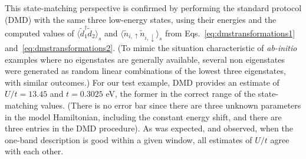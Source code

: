 This state-matching perspective is confirmed by performing the standard protocol (DMD) with the same three low-energy states, 
using their energies and the computed values of $\langle \tilde{d}_1^{\dagger} \tilde{d}_2 \rangle_s$ 
and $\langle \tilde{n}_{i,\uparrow} \tilde{n}_{i,\downarrow} \rangle_{s}$ from Eqs.~\eqref{eq:dmstransformations1} 
and~\eqref{eq:dmstransformations2}. 
(To mimic the situation characteristic of \textit{ab-initio} examples where no eigenstates are generally available, 
several non eigenstates were generated as random linear combinations of the lowest three eigenstates, with 
similar outcomes.) For our test example, DMD provides an estimate of $U/t = 13.45 $ and $t = 0.3025 $ eV, 
the former in the correct range of the state-matching values. (There is no error bar since there 
are three unknown parameters in the model Hamiltonian, including the constant energy shift, and there 
are three entries in the DMD procedure). As was expected, and observed, when the one-band description 
is good within a given window, all estimates of $U/t$ agree with each other. 
